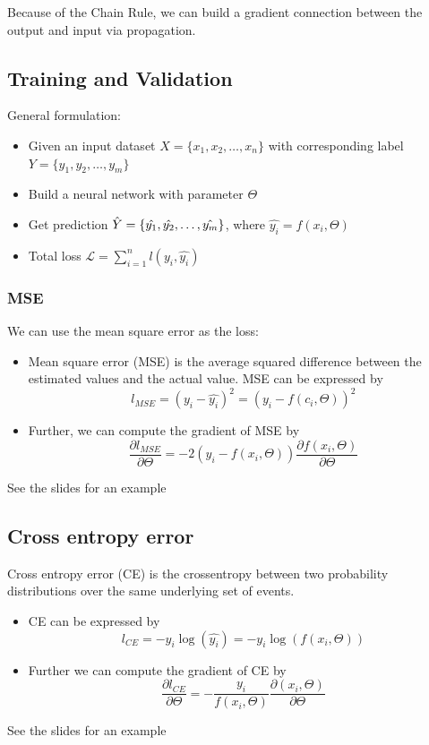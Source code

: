 \documentclass[letterpaper,12pt]{article}
\begin{document}
Because of the Chain Rule, we can build a gradient connection between the output and input via propagation. 

\subsection{Training and Validation}

General formulation:\begin{itemize}
    \item Given an input dataset $X=\{x_1,x_2,\ldots,x_n\}$ with corresponding label $Y=\{y_1,y_2,\ldots,y_m\}$
    \item Build a neural network with parameter $\Theta$
    \item Get prediction $\Hat{Y}=\{\hat{y_1},\hat{y_2},\ldots,\hat{y_m}\}$, where $\hat{y_i}=f(x_i,\Theta)$
    \item Total loss $\mathcal{L}=\sum_{i=1}^{n}l(y_i,\hat{y_i})$
\end{itemize}
\subsubsection{MSE}
We can use the mean square error as the loss:\begin{itemize}
    \item Mean square error (MSE) is the average squared difference between the estimated values and the actual value. MSE can be expressed by\[l_{MSE}=(y_i-\hat{y_i})^2=(y_i-f(c_i,\Theta))^2\]
    \item Further, we can compute the gradient of MSE by\[\frac{\partial l_{MSE}}{\partial \Theta}=-2(y_i-f(x_i,\Theta))\frac{\partial f(x_i,\Theta)}{\partial \Theta}\]
\end{itemize}
See the slides for an example
\subsection{Cross entropy error}
Cross entropy error (CE) is the cross\-entropy between two probability distributions over the same underlying set of events. \begin{itemize}
    \item CE can be expressed by \[l_{CE}=-y_i\log(\hat{y_i})=-y_i\log(f(x_i,\Theta))\]
    \item Further we can compute the gradient of CE by\[\frac{\partial l_{CE}}{\partial \Theta}=-\frac{y_i}{f(x_i,\Theta)}\frac{\partial (x_i,\Theta)}{\partial\Theta}\]
\end{itemize}
See the slides for an example
\end{document}
